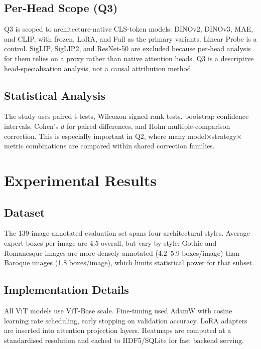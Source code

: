 \documentclass{article}
\begin{document}
\subsection{Per-Head Scope (Q3)}

Q3 is scoped to architecture-native CLS-token models: DINOv2, DINOv3, MAE,
and CLIP, with frozen, LoRA, and Full as the primary variants. Linear Probe is
a control. SigLIP, SigLIP2, and ResNet-50 are excluded because per-head
analysis for them relies on a proxy rather than native attention heads. Q3 is a
descriptive head-specialisation analysis, not a causal attribution method.

\subsection{Statistical Analysis}

The study uses paired t-tests, Wilcoxon signed-rank tests, bootstrap confidence
intervals, Cohen's $d$ for paired differences, and Holm multiple-comparison
correction. This is especially important in Q2, where many
model$\times$strategy$\times$metric combinations are compared within shared
correction families.

\section{Experimental Results}
\label{sec:results}

\subsection{Dataset}

The 139-image annotated evaluation set spans four architectural styles. Average
expert boxes per image are 4.5 overall, but vary by style: Gothic and
Romanesque images are more densely annotated (4.2--5.9 boxes/image) than
Baroque images (1.8 boxes/image), which limits statistical power for that
subset.

\subsection{Implementation Details}

All ViT models use ViT-Base scale. Fine-tuning used AdamW with cosine learning
rate scheduling, early stopping on validation accuracy. LoRA adapters are
inserted into attention projection layers. Heatmaps are computed at a
standardised resolution and cached to HDF5/SQLite for fast backend serving.
\end{document}
